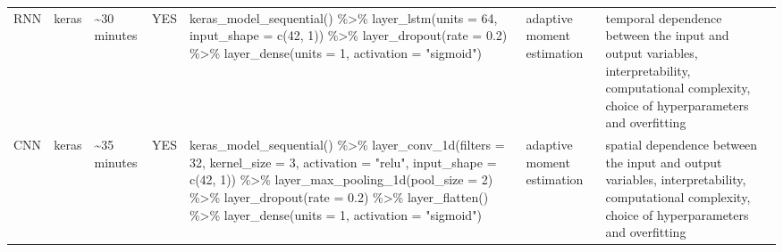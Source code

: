 \documentclass[preprint, 3p,
authoryear]{elsarticle} %
\begin{document}
\begin{table}[!h]
\begin{tabular}[t]{lllllll}
RNN & keras & \textasciitilde{}30 minutes & YES & keras\_model\_sequential() \%>\%  layer\_lstm(units = 64, input\_shape = c(42, 1)) \%>\%  layer\_dropout(rate = 0.2) \%>\%  layer\_dense(units = 1, activation = "sigmoid") & adaptive moment estimation & temporal dependence between the input and output variables, interpretability, computational complexity, choice of hyperparameters and overfitting\\
CNN & keras & \textasciitilde{}35 minutes & YES & keras\_model\_sequential() \%>\%  layer\_conv\_1d(filters = 32, kernel\_size = 3, activation = "relu", input\_shape = c(42, 1)) \%>\%  layer\_max\_pooling\_1d(pool\_size = 2) \%>\%
layer\_dropout(rate = 0.2) \%>\%  layer\_flatten() \%>\%  layer\_dense(units = 1, activation = "sigmoid") & adaptive moment estimation & spatial dependence between the input and output variables, interpretability, computational complexity, choice of hyperparameters and overfitting\\
\bottomrule
\end{tabular}
\end{table}


\end{document}
